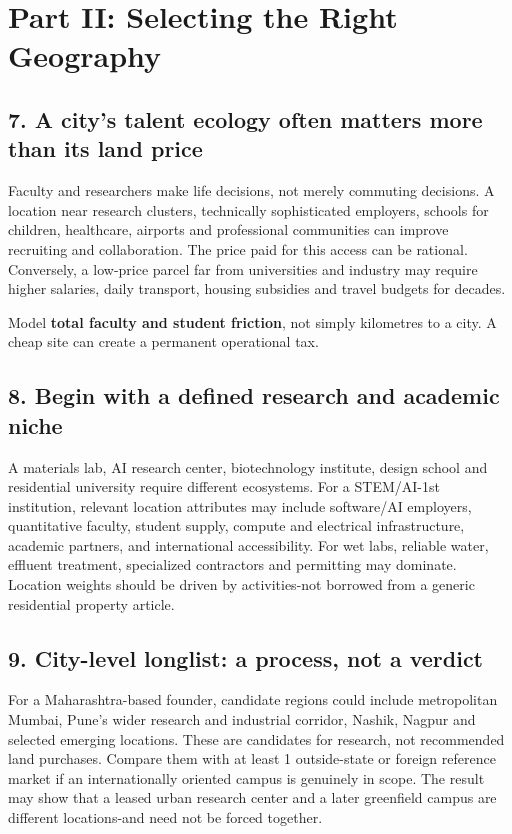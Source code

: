 \section*{Part II: Selecting the Right Geography}


\subsection{7. A city's talent ecology often matters more than its land price}

Faculty and researchers make life decisions, not merely commuting decisions. A location near research clusters, technically sophisticated employers, schools for children, healthcare, airports and professional communities can improve recruiting and collaboration. The price paid for this access can be rational. Conversely, a low-price parcel far from universities and industry may require higher salaries, daily transport, housing subsidies and travel budgets for decades.

Model \textbf{total faculty and student friction}, not simply kilometres to a city. A cheap site can create a permanent operational tax.


\subsection{8. Begin with a defined research and academic niche}

A materials lab, AI research center, biotechnology institute, design school and residential university require different ecosystems. For a STEM/AI-1st institution, relevant location attributes may include software/AI employers, quantitative faculty, student supply, compute and electrical infrastructure, academic partners, and international accessibility. For wet labs, reliable water, effluent treatment, specialized contractors and permitting may dominate. Location weights should be driven by activities-not borrowed from a generic residential property article.


\subsection{9. City-level longlist: a process, not a verdict}

For a Maharashtra-based founder, candidate regions could include metropolitan Mumbai, Pune's wider research and industrial corridor, Nashik, Nagpur and selected emerging locations. These are candidates for research, not recommended land purchases. Compare them with at least 1 outside-state or foreign reference market if an internationally oriented campus is genuinely in scope. The result may show that a leased urban research center and a later greenfield campus are different locations-and need not be forced together.

